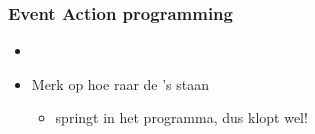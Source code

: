 




\begin{frame}
\frametitle{Event \tifonttxt{\>} Action programming}

\vspace{-1cm}

\begin{itemize}
  \item<2-> 
  \item<3-> Merk op hoe raar de 's staan
  \begin{itemize}
    \item<4->  springt in het programma, dus klopt wel!
  \end{itemize}
\end{itemize}

\vspace{3cm}


\end{frame}
